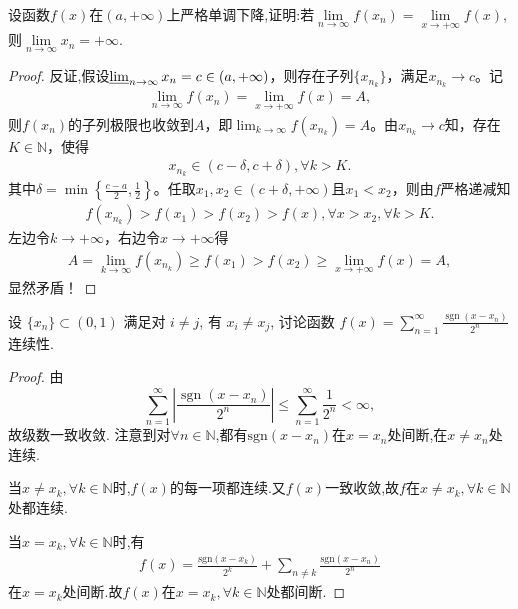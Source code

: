 \documentclass[../../main.tex]{subfiles}
\begin{document}
\begin{example}
设函数$f(x)$在$(a,+\infty)$上严格单调下降,证明:若$\lim\limits_{n \to \infty} f(x_n)=\lim\limits_{x \to +\infty} f(x)$,则$\lim\limits_{n \to \infty} x_n=+\infty$. 
\end{example}
\begin{proof}
反证,假设$\varliminf_{n\rightarrow \infty}x_n=c\in \left( a,+\infty \right)$，则存在子列$\{ x_{n_k} \}$，满足$x_{n_k}\rightarrow c$。记
\begin{align*}
\lim_{n\rightarrow \infty}f\left( x_n \right) =\lim_{x\rightarrow +\infty}f\left( x \right) =A,
\end{align*}
则$f\left( x_n \right)$的子列极限也收敛到$A$，即$\lim_{k\rightarrow \infty}f\left( x_{n_k} \right) =A$。由$x_{n_k}\rightarrow c$知，存在$K\in \mathbb{N}$，使得
\begin{align*}
x_{n_k}\in \left( c-\delta ,c+\delta \right),\forall k>K.
\end{align*}
其中$\delta =\min \left\{ \frac{c-a}{2},\frac{1}{2} \right\}$。任取$x_1,x_2\in \left( c+\delta ,+\infty \right)$且$x_1<x_2$，则由$f$严格递减知
\begin{align*}
f\left( x_{n_k} \right) >f\left( x_1 \right) >f\left( x_2 \right) >f\left( x \right),\forall x>x_2,\forall k>K.
\end{align*}
左边令$k\rightarrow +\infty$，右边令$x\rightarrow +\infty$得
\begin{align*}
A=\lim_{k\rightarrow \infty}f\left( x_{n_k} \right) \geqslant f\left( x_1 \right) >f\left( x_2 \right) \geqslant \lim_{x\rightarrow +\infty}f\left( x \right) =A,
\end{align*}
显然矛盾！
\end{proof}

\begin{example}
设 $\{x_n\} \subset (0,1)$ 满足对 $i \neq j$, 有 $x_i \neq x_j$, 讨论函数 $f(x) = \sum_{n=1}^\infty \frac{\operatorname{sgn}(x - x_n)}{2^n}$ 连续性.
\end{example}
\begin{proof}
由
\[
\sum_{n=1}^\infty \left| \frac{\operatorname{sgn}(x - x_n)}{2^n} \right| \leqslant \sum_{n=1}^\infty \frac{1}{2^n} < \infty,
\]
故级数一致收敛. 注意到对$\forall n\in \mathbb{N} $,都有$\mathrm{sgn} \left( x-x_n \right) $在$x=x_n$处间断,在$x\ne x_n$处连续.

当$x\ne x_k,\forall k\in \mathbb{N} $时,$f\left( x \right) $的每一项都连续.又$f\left( x \right) $一致收敛,故$f$在$x\ne x_k,\forall k\in \mathbb{N} $处都连续.

当$x=x_k,\forall k\in \mathbb{N} $时,有
\begin{align*}
f\left( x \right) =\frac{\mathrm{sgn} \left( x-x_k \right)}{2^k}+\sum_{n\ne k}{\frac{\mathrm{sgn} \left( x-x_n \right)}{2^n}}
\end{align*}
在$x=x_k$处间断.故$f\left( x \right) $在$x=x_k,\forall k\in \mathbb{N} $处都间断.
\end{proof}
\end{document}
